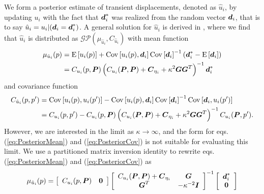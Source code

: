 \documentclass[extra,mreferee]{gji}
\begin{document}
We form a posterior estimate of transient displacements, denoted as $\hat{u}_i$, by updating $u_i$ with the fact that $\mitbf{d}_i^*$ was realized from the random vector $\mitbf{d}_i$, that is to say $\hat{u}_i = u_i |(\mitbf{d}_i = \mitbf{d}^*_i)$. A general solution for $\hat{u}_i$ is derived in \citet[sec. 8.9]{VonMises1964}, where we find that $\hat{u}_i$ is distributed as $\mathcal{GP}(\mu_{\hat{u}_i},C_{\hat{u}_i})$ with mean function
\begin{align}\label{eq:PosteriorMean}
\mu_{\hat{u}_i}(p) &= \mathrm{E}\left[u_i(p)\right] + 
                      \mathrm{Cov}\left[u_i(p),\mitbf{d}_i\right] 
                      \mathrm{Cov}\left[\mitbf{d}_i\right]^{-1}
                      \left(\mitbf{d}^*_i - \mathrm{E}\left[\mitbf{d}_i\right]\right)\nonumber \\
                   &= C_{u_i}(p,\mitbf{P})\left( C_{u_i}(\mitbf{P},\mitbf{P}) + \mitbf{C}_{\eta_i} + \kappa^2\mitbf{G}\mitbf{G}^T\right)^{-1}\mitbf{d}^*_i
\end{align}    
and covariance function
\begin{align}\label{eq:PosteriorCov}
C_{\hat{u}_i}(p,p') &= \mathrm{Cov}\left[u_i(p),u_i(p')\right] - 
                       \mathrm{Cov}\left[u_i(p),\mitbf{d}_i\right] 
                       \mathrm{Cov}\left[\mitbf{d}_i\right]^{-1}
                       \mathrm{Cov}\left[\mitbf{d}_i,u_i(p')\right]\nonumber \\
                    &= C_{u_i}(p,p') - C_{u_i}(p,\mitbf{P})\left( C_{u_i}(\mitbf{P},\mitbf{P}) + \mitbf{C}_{\eta_i} + \kappa^2\mitbf{G}\mitbf{G}^T \right)^{-1}C_{u_i}(\mitbf{P},p').
\end{align}
However, we are interested in the limit as $\kappa \to \infty$, and the form for eqs. (\ref{eq:PosteriorMean}) and (\ref{eq:PosteriorCov}) is not suitable for evaluating this limit. We use a partitioned matrix inversion identity \citep[sec. 2.7.4]{Press2007} to rewrite eqs. (\ref{eq:PosteriorMean}) and (\ref{eq:PosteriorCov}) as
 \begin{equation}\label{eq:PosteriorMean2}
\mu_{\hat{u}_i}(p) = \left[\begin{array}{cc}
                         C_{u_i}(p,\mitbf{P}) & \mitbf{0} \\
                         \end{array}\right]
                     \left[\begin{array}{cc}
                         C_{u_i}(\mitbf{P},\mitbf{P}) + \mitbf{C}_{\eta_i} & \mitbf{G} \\
                         \mitbf{G}^T  & -\kappa^{-2} \mitbf{I} \\
                         \end{array}\right]^{-1}
                     \left[\begin{array}{c}
                         \mitbf{d}^*_i \\
                         \mitbf{0} \\
                         \end{array}\right]
\end{equation}    
\end{document}
